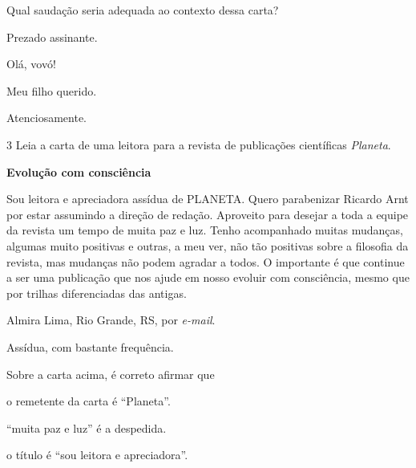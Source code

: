 \begin{conteudo}
\begin{conteudo}
\pagebreak
Qual saudação seria adequada ao contexto dessa carta?

\begin{escolha}
\item Prezado assinante.

\item Olá, vovó!

\item Meu filho querido.

\item Atenciosamente.
\end{escolha}

\num{3} Leia a carta de uma leitora para a revista de publicações
científicas \textit{Planeta}.


\begin{myquote}
\textbf{Evolução com consciência}

Sou leitora e apreciadora assídua de PLANETA. Quero parabenizar Ricardo
Arnt por estar assumindo a direção de redação. Aproveito para desejar a
toda a equipe da revista um tempo de muita paz e luz. Tenho acompanhado
muitas mudanças, algumas muito positivas e outras, a meu ver, não tão
positivas sobre a filosofia da revista, mas mudanças não podem agradar a
todos. O importante é que continue a ser uma publicação que nos ajude em
nosso evoluir com consciência, mesmo que por trilhas diferenciadas das
antigas.

\begin{flushright}
Almira Lima, Rio Grande, RS, por \emph{e-mail}.
\end{flushright}


\begin{small}
 Assídua, com bastante frequência.
\end{small}
\end{myquote}

Sobre a carta acima, é correto afirmar que 

\begin{escolha}
\item o remetente da carta é ``Planeta''.

\item ``muita paz e luz'' é a despedida.

\item o título é ``sou leitora e apreciadora''.


\end{escolha}
\end{conteudo}
\end{conteudo}
